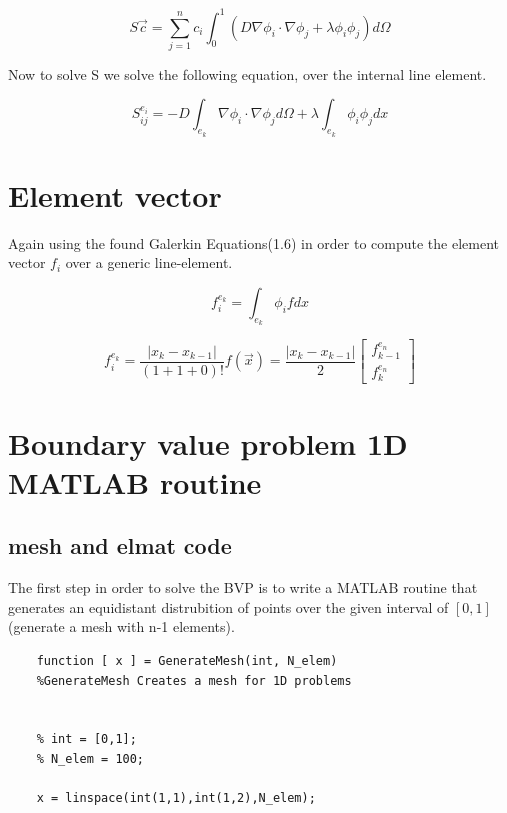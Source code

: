 \documentclass{report}
\begin{document}
\begin{equation}
S\vec{c}=	\sum_{j=1}^{n}c_i\int_{0}^{1} (D\nabla\phi_i\cdot\nabla\phi_j +\lambda\phi_i\phi_j )d\Omega
\end{equation}
\medskip

Now to solve S we solve the following equation, over the internal line element.

\begin{equation}
S^{e_i}_{ij} = -D\int_{e_k}\nabla\phi_i\cdot\nabla\phi_j d\Omega+\lambda\int_{e_k}\phi_i\phi_j dx
\end{equation}


\section{Element vector}
Again using the found Galerkin Equations(1.6) in order to compute the element vector $f_i$ over a generic line-element.

\begin{equation}
f^{e_k}_i = \int_{e_k}\phi_i f dx
\end{equation}

\begin{equation}
	f^{e_k}_i =\frac{\lvert x_k-x_{k-1}\lvert}{(1+1+0)!}f(\vec{x}) =\frac{\lvert x_k-x_{k-1}\lvert}{2}
	\begin{bmatrix} f^{e_n}_{k-1}\\ f^{e_n}_{k}
	\end{bmatrix}
\end{equation}







\section{Boundary value problem 1D MATLAB routine}

\subsection{mesh and elmat code}
The first step in order to solve the BVP is to write a MATLAB routine that generates an equidistant distrubition of points over the given interval of $[0,1]$(generate a mesh with n-1 elements).

\begin{lstlisting}
	function [ x ] = GenerateMesh(int, N_elem)
	%GenerateMesh Creates a mesh for 1D problems
	
	
	% int = [0,1];
	% N_elem = 100;
	
	x = linspace(int(1,1),int(1,2),N_elem);
	
\end{lstlisting}
	
\end{document}
